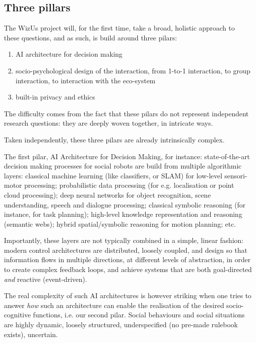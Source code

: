 \documentclass[11pt,a4paper]{report}
\newcommand{\project}{WizUs\xspace}
\begin{document}
\subsection{Three pillars}

The \project project will, for the first time, take a broad, holistic approach
to these questions, and as such, is build around three pilars:

\begin{enumerate}
    \item AI architecture for decision making
    \item socio-psychological design of the interaction, from 1-to-1
        interaction, to group interaction, to interaction with the eco-system
    \item built-in privacy and ethics
\end{enumerate}

The difficulty comes from the fact that these pilars do not represent independent
research questions: they are deeply woven together, in intricate ways.

Taken independently, these three pilars are already intrinsically complex.

The first pilar, AI Architecture for Decision Making, for instance:
state-of-the-art decision making processes for social robots are build from
multiple algorithmic layers: classical machine learning (like classifiers, or
SLAM) for low-level sensori-motor processing; probabilistic data processing (for
e.g. localisation or point cloud processing); deep neural networks for object
recognition, scene understanding, speech and dialogue processing; classical
symbolic reasoning (for instance, for task planning); high-level knowledge
representation and reasoning (semantic webs); hybrid spatial/symbolic reasoning
for motion planning; etc.

Importantly, these layers are not typically combined in a simple, linear
fashion: modern control architectures are distributed, loosely coupled, and
design so that information flows in multiple directions, at different levels of
abstraction, in order to create complex feedback loops, and achieve systems that are
both goal-directed \emph{and} reactive (event-driven).


The real complexity of such AI architectures is however striking when one tries
to answer \emph{how} such an architecture can enable the realisation of the
desired socio-cognitive functions, i.e. our second pilar. Social behaviours and
social situations are highly dynamic, loosely structured, underspecified (no
pre-made rulebook exists), uncertain.
\end{document}
